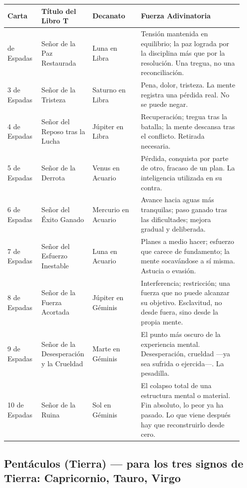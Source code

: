 \begin{longtable}[]{@{}>{\RaggedRight\small}p{0.14\linewidth}>{\RaggedRight\small}p{0.18\linewidth}>{\RaggedRight\small}p{0.20\linewidth}>{\RaggedRight\small}p{0.42\linewidth}@{}}
\toprule\noalign{}
Carta & Título del Libro T & Decanato & Fuerza Adivinatoria \\
\midrule\noalign{}
\endhead
\bottomrule\noalign{}
\endlastfoot
2 de Espadas & Señor de la Paz Restaurada & Luna en Libra & Tensión mantenida en equilibrio; la paz lograda por la disciplina más que por la resolución. Una tregua, no una reconciliación. \\
3 de Espadas & Señor de la Tristeza & Saturno en Libra & Pena, dolor, tristeza. La mente registra una pérdida real. No se puede negar. \\
4 de Espadas & Señor del Reposo tras la Lucha & Júpiter en Libra & Recuperación; tregua tras la batalla; la mente descansa tras el conflicto. Retirada necesaria. \\
5 de Espadas & Señor de la Derrota & Venus en Acuario & Pérdida, conquista por parte de otro, fracaso de un plan. La inteligencia utilizada en su contra. \\
6 de Espadas & Señor del Éxito Ganado & Mercurio en Acuario & Avance hacia aguas más tranquilas; paso ganado tras las dificultades; mejora gradual y deliberada. \\
7 de Espadas & Señor del Esfuerzo Inestable & Luna en Acuario & Planes a medio hacer; esfuerzo que carece de fundamento; la mente socavándose a sí misma. Astucia o evasión. \\
8 de Espadas & Señor de la Fuerza Acortada & Júpiter en Géminis & Interferencia; restricción; una fuerza que no puede alcanzar su objetivo. Esclavitud, no desde fuera, sino desde la propia mente. \\
9 de Espadas & Señor de la Desesperación y la Crueldad & Marte en Géminis & El punto más oscuro de la experiencia mental. Desesperación, crueldad ---ya sea sufrida o ejercida---. La pesadilla. \\
10 de Espadas & Señor de la Ruina & Sol en Géminis & El colapso total de una estructura mental o material. Fin absoluto, lo peor ya ha pasado. Lo que viene después hay que reconstruirlo desde cero. \\
\end{longtable}

\subsection{Pentáculos (Tierra) --- para los tres signos de Tierra: Capricornio, Tauro, Virgo}\label{pentacles-earth--suits-the-three-earth-signs-capricorn-taurus-virgo}

